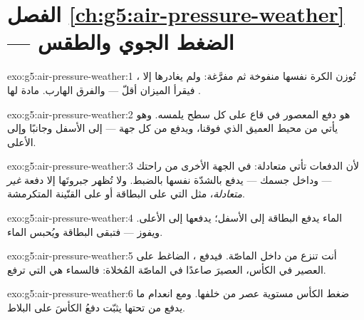 \section*{الفصل \ref{ch:g5:air-pressure-weather} --- الضغط الجوي والطقس}

\begin{solution}{exo:g5:air-pressure-weather:1}
تُوزن الكرة نفسها منفوخة ثم مفرَّغة: ولم يغادرها إلا ،
فيقرأ الميزان أقلّ --- والفرق   الهارب.  مادة
لها .
\end{solution}

\begin{solution}{exo:g5:air-pressure-weather:2}
هو دفع  المعصور في قاع  على كل سطح يلمسه.
وهو يأتي من  محيط  العميق الذي فوقنا، ويدفع من كل جهة
--- إلى الأسفل وجانبًا وإلى الأعلى.
\end{solution}

\begin{solution}{exo:g5:air-pressure-weather:3}
لأن الدفعات تأتي متعادلة:  في الجهة الأخرى من راحتك ---
وداخل جسمك --- يدفع بالشدّة نفسها بالضبط. ولا تُظهر جبروتَها
إلا دفعة \emph{غير متعادلة}، مثل التي على البطاقة أو على
القنّينة المتكرمشة.
\end{solution}

\begin{solution}{exo:g5:air-pressure-weather:4}
 الماء يدفع البطاقة إلى الأسفل؛  يدفعها إلى
الأعلى. ويفوز  --- فتبقى البطاقة ويُحبس الماء.
\end{solution}

\begin{solution}{exo:g5:air-pressure-weather:5}
أنت تنزع \emph{} من داخل الماصّة. فيدفع ،
الضاغط على العصير في الكأس، العصيرَ صاعدًا في الماصّة المُخلاة:
فالسماء هي التي ترفع.
\end{solution}

\begin{solution}{exo:g5:air-pressure-weather:6}
ضغط الكأس مستوية عصر  من خلفها. ومع انعدام ما يدفع من
تحتها يثبّت دفعُ  الكأسَ على البلاط.
\end{solution}

